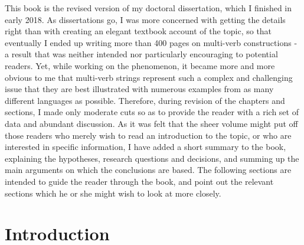 
This book is the revised version of my doctoral dissertation, which I finished in early 2018. As dissertations go, I was more concerned with getting the details right than with creating an elegant textbook account of the topic, so that eventually I ended up writing more than 400 pages on multi-verb constructions - a result that was neither intended nor particularly encouraging to potential readers. Yet, while working on the phenomenon, it became more and more obvious to me that multi-verb strings represent such a complex and challenging issue that they are best illustrated with numerous examples from as many different languages as possible. Therefore, during revision of the chapters and sections, I made only moderate cuts so as to provide the reader with a rich set of data and abundant discussion. As it was felt that the sheer volume might put off those readers who merely wish to read an introduction to the topic, or who are interested in specific information, I have added a short summary to the book, explaining the hypotheses, research questions and decisions, and summing up the main arguments on which the conclusions are based. The following sections are intended to guide the reader through the book, and point out the relevant sections which he or she might wish to look at more closely. 

\section*{Introduction}

